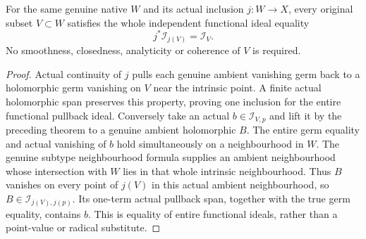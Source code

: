 \begin{theorem}
\label{hir:actual-submanifold-whole-singular-vanishing-restriction}
\leanok
For the same genuine native $W$ and its actual inclusion $j:W\to X$,
every original subset $V\subset W$ satisfies the whole independent
functional ideal equality
\[
 j^*\mathcal I_{j(V)}=\mathcal I_V.
\]
No smoothness, closedness, analyticity or coherence of $V$ is required.
\end{theorem}
\begin{proof}
Actual continuity of $j$ pulls each genuine ambient vanishing germ back
to a holomorphic germ vanishing on $V$ near the intrinsic point. A finite
actual holomorphic span preserves this property, proving one inclusion
for the entire functional pullback ideal. Conversely take an actual
$b\in\mathcal I_{V,p}$ and lift it by the preceding theorem to a genuine
ambient holomorphic $B$. The entire germ equality and actual vanishing
of $b$ hold simultaneously on a neighbourhood in $W$. The genuine subtype
neighbourhood formula supplies an ambient neighbourhood whose intersection
with $W$ lies in that whole intrinsic neighbourhood. Thus $B$ vanishes
on every point of $j(V)$ in this actual ambient neighbourhood, so
$B\in\mathcal I_{j(V),j(p)}$. Its one-term actual pullback span, together
with the true germ equality, contains $b$. This is equality of entire
functional ideals, rather than a point-value or radical substitute.
\end{proof}

